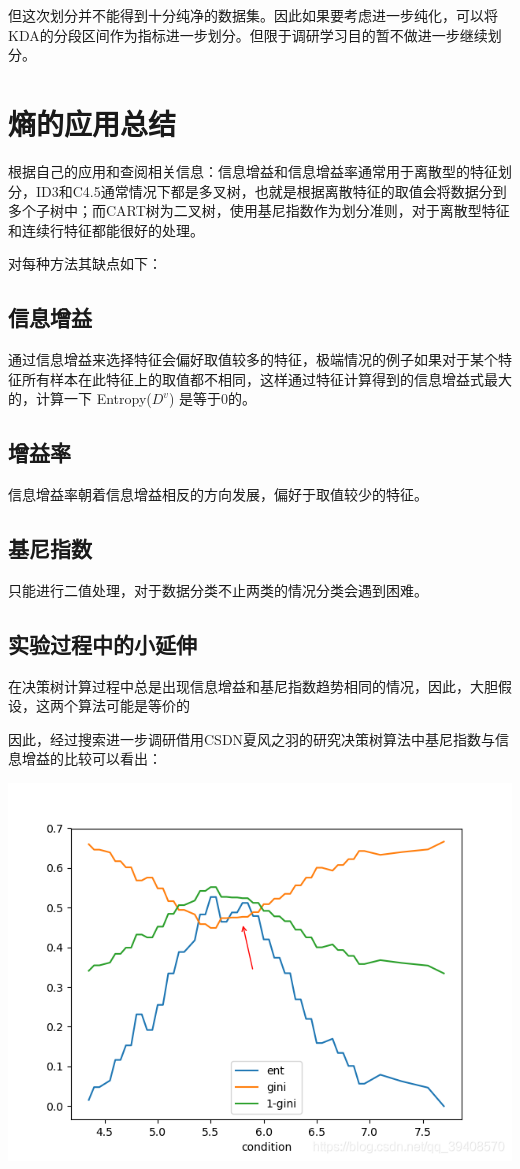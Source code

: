 \documentclass[lang=cn,11pt]{elegantpaper}
\begin{document}
但这次划分并不能得到十分纯净的数据集。因此如果要考虑进一步纯化，可以将KDA的分段区间作为指标进一步划分。但限于调研学习目的暂不做进一步继续划分。

\section{熵的应用总结}
根据自己的应用和查阅相关信息：信息增益和信息增益率通常用于离散型的特征划分，ID3和C4.5通常情况下都是多叉树，也就是根据离散特征的取值会将数据分到多个子树中；而CART树为二叉树，使用基尼指数作为划分准则，对于离散型特征和连续行特征都能很好的处理。

对每种方法其缺点如下：
\subsection{信息增益}
通过信息增益来选择特征会偏好取值较多的特征，极端情况的例子如果对于某个特征所有样本在此特征上的取值都不相同，这样通过特征计算得到的信息增益式最大的，计算一下 Entropy($D^v$) 是等于0的。
\subsection{增益率}
信息增益率朝着信息增益相反的方向发展，偏好于取值较少的特征。
\subsection{基尼指数}
只能进行二值处理，对于数据分类不止两类的情况分类会遇到困难。
\subsection{实验过程中的小延伸}
在决策树计算过程中总是出现信息增益和基尼指数趋势相同的情况，因此，大胆假设，这两个算法可能是等价的

因此，经过搜索进一步调研借用CSDN夏风之羽的研究决策树算法中基尼指数与信息增益的比较\cite{决策树算法中基尼指数与信息增益的比较}可以看出：
\begin{center}
\includegraphics[scale=0.5]{pic2.png}\\
\end{center}
\end{document}
